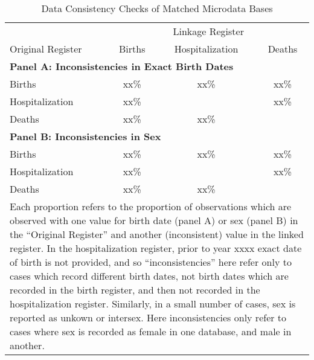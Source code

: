 \documentclass[11pt]{article}
\begin{document}
\begin{spacing}{1.5}
\begin{appendices}
    \begin{table}[htpb!]
    \centering
    \caption{Data Consistency Checks of Matched Microdata Bases}  
    \begin{tabular}{lccc} \toprule
               & \multicolumn{3}{c}{Linkage Register} \\ \cmidrule(r){2-4}  
      Original Register & Births & Hospitalization & Deaths \\ \midrule
      \multicolumn{4}{l}{\textbf{Panel A: Inconsistencies in Exact Birth Dates}} \\
      Births          & xx\% & xx\% & xx\% \\
      Hospitalization \hspace{2cm} & xx\% &      & xx\% \\
      Deaths          & xx\% & xx\% &      \\
      \multicolumn{4}{l}{\textbf{Panel B: Inconsistencies in Sex}} \\
      Births          & xx\% & xx\% & xx\% \\
      Hospitalization & xx\% &      & xx\% \\
      Deaths          & xx\% & xx\% &      \\ \bottomrule
      \multicolumn{4}{p{10.2cm}}{\footnotesize Each proportion refers to
        the proportion of observations which are observed with one value
        for birth date (panel A) or sex (panel B) in the ``Original Register''
        and another (inconsistent) value in the linked register. In the
        hospitalization register, prior to year xxxx exact date of birth
        is not provided, and so ``inconsistencies'' here refer only to cases
        which record different birth dates, not birth dates which are recorded
        in the birth register, and then not recorded in the hospitalization
        register.  Similarly, in a small number of cases, sex is reported
        as unkown or intersex.  Here inconsistencies only refer to cases where
        sex is recorded as female in one database, and male in another.} \\
    \end{tabular}
  \end{table}


\end{appendices}
\end{spacing}
\end{document}
